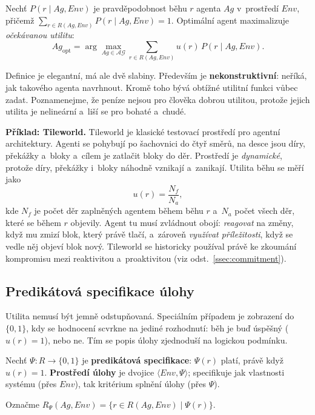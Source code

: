 \documentclass[11pt,a4paper]{article}
\theoremstyle{definition}
\begin{document}
\begin{defbox}
Nechť $P(r \mid Ag, \mathit{Env})$ je pravděpodobnost běhu $r$ agenta $Ag$ v~prostředí $\mathit{Env}$,
přičemž $\sum_{r \in R(Ag,\mathit{Env})} P(r \mid Ag,\mathit{Env}) = 1$. Optimální agent maximalizuje
\emph{očekávanou utilitu}:
\[
Ag_{\mathrm{opt}} = \arg\max_{Ag \in \mathcal{AG}} \sum_{r \in R(Ag,\mathit{Env})}
u(r)\, P(r \mid Ag, \mathit{Env}).
\]
\end{defbox}

Definice je elegantní, má ale dvě slabiny. Především je \textbf{nekonstruktivní}: neříká,
jak takového agenta navrhnout. Kromě toho bývá obtížné utilitní funkci vůbec zadat. Poznamenejme,
že peníze nejsou pro člověka dobrou utilitou, protože jejich utilita je nelineární a~liší se pro
bohaté a~chudé.

\medskip
\noindent\textbf{Příklad: Tileworld.} Tileworld je klasické testovací prostředí pro agentní
architektury. Agenti se pohybují po šachovnici do čtyř směrů, na desce jsou díry, překážky
a~bloky a~cílem je zatlačit bloky do děr. Prostředí je \emph{dynamické}, protože díry, překážky
i~bloky náhodně vznikají a~zanikají. Utilita běhu se měří jako
\[
u(r) = \frac{N_f}{N_a},
\]
kde $N_f$ je počet děr zaplněných agentem během běhu $r$ a~$N_a$ počet všech děr, které se
během $r$ objevily. Agent tu musí zvládnout obojí: \emph{reagovat} na změny, když mu zmizí blok,
který právě tlačí, a~zároveň \emph{využívat příležitosti}, když se vedle něj objeví blok nový.
Tileworld se historicky používal právě ke zkoumání kompromisu mezi reaktivitou a~proaktivitou
(viz odst.~\ref{ssec:commitment}).

\subsection{Predikátová specifikace úlohy}

Utilita nemusí být jemně odstupňovaná. Speciálním případem je zobrazení do $\{0,1\}$, kdy se
hodnocení scvrkne na jediné rozhodnutí: běh je buď úspěšný ($u(r)=1$), nebo ne. Tím se popis
úlohy zjednoduší na logickou podmínku.

\begin{defbox}
Nechť $\Psi : R \to \{0,1\}$ je \textbf{predikátová specifikace}: $\Psi(r)$ platí, právě když
$u(r) = 1$. \textbf{Prostředí úlohy} je dvojice $\langle \mathit{Env}, \Psi \rangle$; specifikuje
jak vlastnosti systému (přes $\mathit{Env}$), tak kritérium splnění úlohy (přes $\Psi$).

Označme $R_\Psi(Ag,\mathit{Env}) = \{ r \in R(Ag,\mathit{Env}) \mid \Psi(r) \}$.
\end{defbox}
\end{document}
